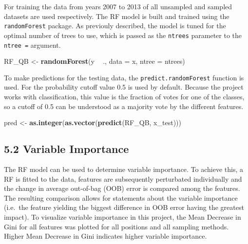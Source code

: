 \documentclass[]{article}
\newenvironment{Shaded}{\begin{snugshade}}{\end{snugshade}}
\newcommand{\DataTypeTok}[1]{\textcolor[rgb]{0.13,0.29,0.53}{#1}}
\newcommand{\KeywordTok}[1]{\textcolor[rgb]{0.13,0.29,0.53}{\textbf{#1}}}
\newcommand{\NormalTok}[1]{#1}
\newcommand{\OperatorTok}[1]{\textcolor[rgb]{0.81,0.36,0.00}{\textbf{#1}}}
\newcommand{\StringTok}[1]{\textcolor[rgb]{0.31,0.60,0.02}{#1}}
\begin{document}
For training the data from years 2007 to 2013 of all unsampled and
sampled datasets are used respectively. The RF model is built and
trained using the \texttt{randomForest} package. As previouly described,
the model is tuned for the optimal number of trees to use, which is
passed as the \texttt{ntrees} parameter to the \texttt{ntree\ =}
argument.

\begin{Shaded}
\begin{Highlighting}[]
\NormalTok{RF_QB <-}\StringTok{ }\KeywordTok{randomForest}\NormalTok{(y }\OperatorTok{~}\StringTok{ }\NormalTok{., }\DataTypeTok{data =}\NormalTok{ x, }\DataTypeTok{ntree =}\NormalTok{ ntrees)}
\end{Highlighting}
\end{Shaded}

To make predictions for the testing data, the
\texttt{predict.randomForest} function is used. For the probability
cutoff value 0.5 is used by default. Because the project works with
classification, this value is the fraction of votes for one of the
classes, so a cutoff of 0.5 can be understood as a majority vote by the
different features.

\begin{Shaded}
\begin{Highlighting}[]
\NormalTok{pred <-}\StringTok{ }\KeywordTok{as.integer}\NormalTok{(}\KeywordTok{as.vector}\NormalTok{(}\KeywordTok{predict}\NormalTok{(RF_QB, x_test)))}
\end{Highlighting}
\end{Shaded}

\hypertarget{variable-importance}{%
\subsection{5.2 Variable Importance}\label{variable-importance}}

The RF model can be used to determine variable importance. To achieve
this, a RF is fitted to the data, features are subsequently perturbated
individually and the change in average out-of-bag (OOB) error is
compared among the features. The resulting comparison allows for
statements about the variable importance (i.e.~the feature yielding the
biggest difference in OOB error having the greatest impact). To
visualize variable importance in this project, the Mean Decrease in Gini
for all features was plotted for all positions and all sampling methods.
Higher Mean Decrease in Gini indicates higher variable importance.
\end{document}
